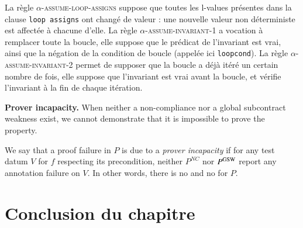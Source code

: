 La règle \textsc{$\alpha$-assume-loop-assigns} suppose que toutes les l-values
présentes dans la clause \lstinline'loop assigns' ont changé de valeur : une
nouvelle valeur non déterministe est affectée à chacune d'elle.
La règle \textsc{$\alpha$-assume-invariant-1} a vocation à remplacer toute la
boucle, elle suppose que le prédicat de l'invariant est vrai, ainsi que la
négation de la condition de boucle (appelée ici \lstinline'loopcond').
La règle \textsc{$\alpha$-assume-invariant-2} permet de supposer que la boucle
a déjà itéré un certain nombre de fois, elle suppose que l'invariant est vrai
avant la boucle, et vérifie l'invariant à la fin de chaque itération.







\textbf{Prover incapacity.}
When neither a non-compliance nor a global subcontract weakness
exist, we cannot demonstrate that it is impossible to prove the property.

\begin{definition} 
\label{def:prov-incap}
We say that a proof failure in $P$ is due to a \emph{prover incapacity} 
if for any test datum $V$ for $f$ respecting its precondition,
neither $P^{NC}$ nor $P^{\mathrm{GSW}}$ report any annotation failure on $V$.
In other words, there is no \NCCE and no \GSWCE for $P$.
\end{definition}




\section*{Conclusion du chapitre}

